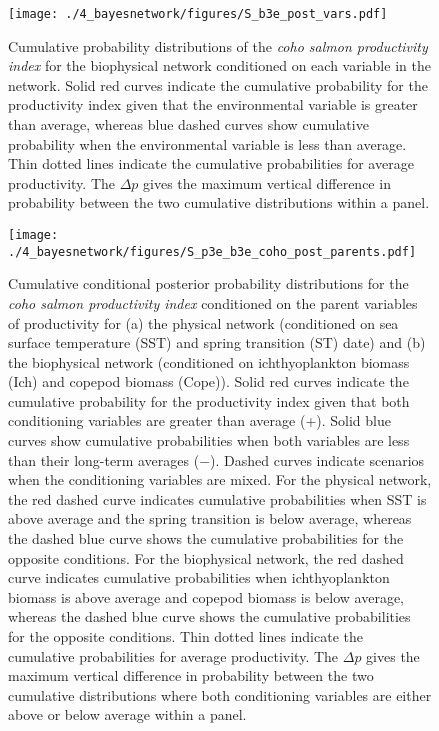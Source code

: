 \begin{figure}[htbp]
  \centering \texttt{[image: ./4\_bayesnetwork/figures/S\_b3e\_post\_vars.pdf]}
  \caption[Cumulative probability distributions of the coho salmon productivity
           index for the biophysical network conditioned on each variable in the
           network]{Cumulative probability distributions of the \emph{coho
           salmon productivity index} for the biophysical network conditioned on
           each variable in the network. Solid red curves indicate the
           cumulative probability for the productivity index given that the
           environmental variable is greater than average, whereas blue
           dashed curves show cumulative probability when the environmental
           variable is less than average. Thin dotted lines indicate the
           cumulative probabilities for average productivity. The \(\Delta p\)
           gives the maximum vertical difference in probability between the two
           cumulative distributions within a panel.}
  \label{fig:bn:s3}
\end{figure}

\begin{figure}[htbp]
  \centering \texttt{[image: ./4\_bayesnetwork/figures/S\_p3e\_b3e\_coho\_post\_parents.pdf]}
  \caption[Cumulative conditional posterior probability distributions for the
           coho salmon productivity index conditioned on the parent variables of
           productivity]{Cumulative conditional posterior probability
           distributions for the \emph{coho salmon productivity index}
           conditioned on the parent variables of productivity for (a) the
           physical network (conditioned on sea surface temperature (SST) and
           spring transition (ST) date) and (b) the biophysical network
           (conditioned on ichthyoplankton biomass (Ich) and copepod biomass
           (Cope)). Solid red curves indicate the cumulative probability
           for the productivity index given that both conditioning variables are
           greater than average (+). Solid blue curves show cumulative
           probabilities when both variables are less than their long-term
           averages ($-$). Dashed curves indicate scenarios when the
           conditioning variables are mixed. For the physical network, the red
           dashed curve indicates cumulative probabilities when SST is above
           average and the spring transition is below average, whereas the
           dashed blue curve shows the cumulative probabilities for the
           opposite conditions. For the biophysical network, the red dashed
           curve indicates cumulative probabilities when ichthyoplankton biomass
           is above average and copepod biomass is below average, whereas the
           dashed blue curve shows the cumulative probabilities for the
           opposite conditions. Thin dotted lines indicate the cumulative
           probabilities for average productivity. The \(\Delta p\) gives the
           maximum vertical difference in probability between the two cumulative
           distributions where both conditioning variables are either above or
           below average within a panel.}
  \label{fig:bn:s4}
\end{figure}
